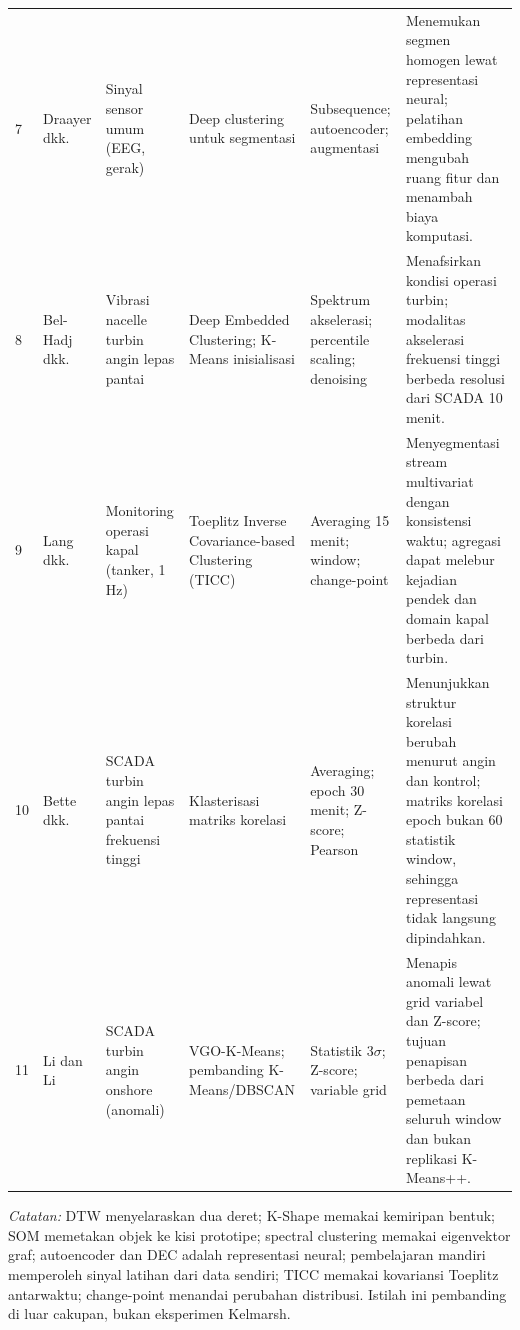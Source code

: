 \begin{table}[!t]
\begin{tabularx}{\textwidth}{@{}P{.02\textwidth}P{.11\textwidth}P{.135\textwidth}P{.125\textwidth}P{.145\textwidth}Y@{}}
7 & Draayer dkk. \cite{draayer2026} & Sinyal sensor umum (EEG, gerak) & Deep clustering untuk segmentasi & Subsequence; autoencoder; augmentasi & Menemukan segmen homogen lewat representasi neural; pelatihan embedding mengubah ruang fitur dan menambah biaya komputasi. \\
8 & Bel-Hadj dkk. \cite{belhadj2026} & Vibrasi nacelle turbin angin lepas pantai & Deep Embedded Clustering; K-Means inisialisasi & Spektrum akselerasi; percentile scaling; denoising & Menafsirkan kondisi operasi turbin; modalitas akselerasi frekuensi tinggi berbeda resolusi dari SCADA 10 menit. \\
9 & Lang dkk. \cite{lang2026} & Monitoring operasi kapal (tanker, 1 Hz) & Toeplitz Inverse Covariance-based Clustering (TICC) & Averaging 15 menit; window; change-point & Menyegmentasi stream multivariat dengan konsistensi waktu; agregasi dapat melebur kejadian pendek dan domain kapal berbeda dari turbin. \\
10 & Bette dkk. \cite{bette2023} & SCADA turbin angin lepas pantai frekuensi tinggi & Klasterisasi matriks korelasi & Averaging; epoch 30 menit; Z-score; Pearson & Menunjukkan struktur korelasi berubah menurut angin dan kontrol; matriks korelasi epoch bukan 60 statistik window, sehingga representasi tidak langsung dipindahkan. \\
11 & Li dan Li \cite{li2026} & SCADA turbin angin onshore (anomali) & VGO-K-Means; pembanding K-Means/DBSCAN & Statistik $3\sigma$; Z-score; variable grid & Menapis anomali lewat grid variabel dan Z-score; tujuan penapisan berbeda dari pemetaan seluruh window dan bukan replikasi K-Means++. \\
\bottomrule
\end{tabularx}
\par\vspace{2pt}
{\footnotesize\textit{Catatan:} DTW menyelaraskan dua deret; K-Shape memakai kemiripan bentuk; SOM memetakan objek ke kisi prototipe; spectral clustering memakai eigenvektor graf; autoencoder dan DEC adalah representasi neural; pembelajaran mandiri memperoleh sinyal latihan dari data sendiri; TICC memakai kovariansi Toeplitz antarwaktu; change-point menandai perubahan distribusi. Istilah ini pembanding di luar cakupan, bukan eksperimen Kelmarsh.\par}
\end{table}

